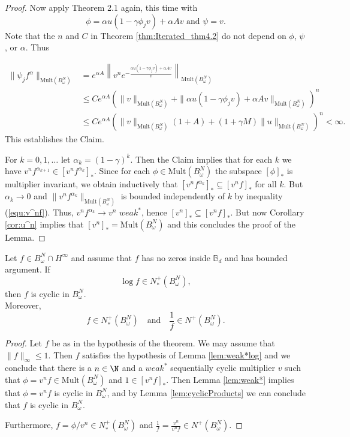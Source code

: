 \documentclass{article}
\numberwithin{equation}{section}
\begin{document}
\begin{proof}
Now apply Theorem 2.1 again, this time with
\[
\phi = \alpha u (1 - \gamma \phi_{j} v) + \alpha  A v
\text{ and }
\psi = v.
\]
Note that the $n$ and $C$ in Theorem \ref{thm:Iterated_thm4.2} do not depend on $\phi$, $\psi$, or $\alpha$. Thus


\begin{align*} \|\psi_jf^\alpha\|_{\mathrm{Mult}(B^{N}_{\omega})}
&=e^{\alpha A} \left\| v^{n}
e^{-\frac{\alpha u (1 - \gamma \phi_{j} v) + \alpha  A v}{v}}
\right\|_{\mathrm{Mult}(B^{N}_{\omega})}\\  
&\leq C e^{\alpha A} 
\left(\|v\|_{\mathrm{Mult}(B^{N}_{\omega})}
+ \|\alpha u (1 - \gamma \phi_{j} v) + \alpha  A v\|_{\mathrm{Mult}(B^{N}_{\omega})}
\right)^{n} \\   
&\leq C e^{\alpha A} \left(
\|v\|_{\mathrm{Mult}(B^{N}_{\omega})}(1 +  A) +
(1 + \gamma M)\|u\|_{\mathrm{Mult}(B^{N}_{\omega})}
\right)^{n} <\infty.
\end{align*}
This establishes the Claim.

 
For $k=0,1, \dots$  let $\alpha_{k} = (1 - \gamma)^{k}.$ Then the Claim implies that for each $k$ we have $v^n f^{\alpha_{k+1}}\in [v^n f^{\alpha_k}]_\ast$.
Since for each $\phi\in \mathrm{Mult}(B^N_\omega)$ the subspace $[\phi]_\ast$ is multiplier invariant, we obtain inductively that $[v^n f^{\alpha_k}]_\ast\subseteq [v^nf]_\ast$ for all $k$. But $\alpha_k\to 0$ and $\|v^n f^{\alpha_k}\|_{\mathrm{Mult}(B^{N}_{\omega})}$ is bounded independently of $k$ by inequality (\ref{equ:v^nf}). Thus, $v^n f^{\alpha_k} \to v^n$ $weak^\ast$, hence $[v^n]_\ast \subseteq [v^nf]_\ast$. But now Corollary \ref{cor:u^n} implies that $[v^n]_\ast = \mathrm{Mult}(B^N_\omega)$ and this concludes the proof of the Lemma.
\end{proof}

    \begin{thm}\label{thm:logN+*} Let $f \in B^{N}_{\omega} \cap H^{\infty}$ and assume that $f$ has no zeros  inside $\mathbb{B}_d$ and has bounded argument. If
\[
\log f \in N^{+}_{*}(B^{N}_{\omega}),
\]
then $f$ is cyclic in $ B^{N}_{\omega}$.\\
Moreover,
\[
f \in N^{+}_{*}(B^{N}_{\omega}) \quad \text{and} \quad 
\frac{1}{f} \in N^{+}(B^{N}_{\omega}).
\]
 \end{thm}

\begin{proof} Let $f$ be as in the hypothesis of the theorem. We may assume that $\|f\|_\infty \le 1$. Then $f$ satisfies the hypothesis of Lemma \ref{lem:weak*log} and we conclude that there is a $n\in \N$ and a $weak^\ast$ sequentially cyclic multiplier $v$ such that $\phi=v^nf\in \mathrm{Mult}(B^N_\omega)$ and $1\in [v^n f]_\ast$. Then Lemma \ref{lem:weak*} implies that $\phi=v^nf$ is cyclic in $B^N_\omega$, and by Lemma \ref{lem:cyclicProducts} we can conclude that $f$ is cyclic in $B^N_\omega$. 

Furthermore, $f=\phi/v^n\in N^+_\ast(B^N_\omega)$ and $\frac{1}{f}=\frac{v^n}{v^n f}\in N^+(B^N_\omega)$.
\end{proof}
\end{document}
